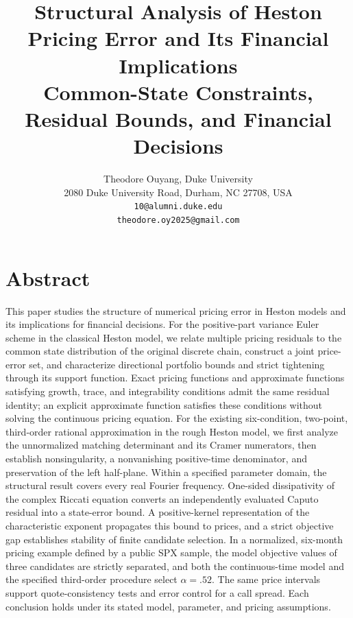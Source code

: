 \documentclass[a4paper,11pt]{article}
\begin{document}
\title{Structural Analysis of Heston Pricing Error and Its Financial Implications\\[5pt]\large Common-State Constraints, Residual Bounds, and Financial Decisions}
\author{Theodore Ouyang, Duke University\\\small 2080 Duke University Road, Durham, NC 27708, USA\\\texttt{10@alumni.duke.edu}\\\texttt{theodore.oy2025@gmail.com}}
\date{}
\maketitle

\section*{Abstract}

This paper studies the structure of numerical pricing error in Heston models and its implications for financial decisions. For the positive-part variance Euler scheme in the classical Heston model, we relate multiple pricing residuals to the common state distribution of the original discrete chain, construct a joint price-error set, and characterize directional portfolio bounds and strict tightening through its support function. Exact pricing functions and approximate functions satisfying growth, trace, and integrability conditions admit the same residual identity; an explicit approximate function satisfies these conditions without solving the continuous pricing equation. For the existing six-condition, two-point, third-order rational approximation in the rough Heston model, we first analyze the unnormalized matching determinant and its Cramer numerators, then establish nonsingularity, a nonvanishing positive-time denominator, and preservation of the left half-plane. Within a specified parameter domain, the structural result covers every real Fourier frequency. One-sided dissipativity of the complex Riccati equation converts an independently evaluated Caputo residual into a state-error bound. A positive-kernel representation of the characteristic exponent propagates this bound to prices, and a strict objective gap establishes stability of finite candidate selection. In a normalized, six-month pricing example defined by a public SPX sample, the model objective values of three candidates are strictly separated, and both the continuous-time model and the specified third-order procedure select \(\alpha=.52\). The same price intervals support quote-consistency tests and error control for a call spread. Each conclusion holds under its stated model, parameter, and pricing assumptions.
\end{document}

